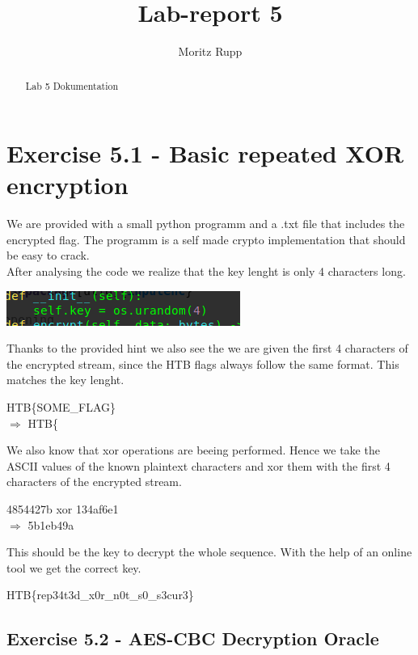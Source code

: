 \documentclass[a4paper,10pt]{article}
\title{Lab-report 5}
\author{Moritz Rupp}
\begin{document}
\maketitle
\tableofcontents
\begin{abstract}
Lab 5 Dokumentation
\end{abstract}
\newpage
\section{Exercise 5.1 - Basic repeated XOR encryption}
We are provided with a small python programm and a .txt file that includes the encrypted flag. The programm is a self made crypto implementation that should be easy to crack.\\
After analysing the code we realize that the key lenght is only 4 characters long.	
\begin{center}
 \includegraphics[scale=0.5]{keylen.png}
\end{center}
Thanks to the provided hint we also see the we are given the first 4 characters of the encrypted stream, since the HTB flags always follow the same format. This matches the key lenght.
\begin{center}
 \begin{shaded}
 HTB\{SOME\_FLAG\}\\
 $\Rightarrow$ HTB\{ 
\end{shaded}
\end{center}
We also know that xor operations are beeing performed. Hence we take the ASCII values of the known plaintext characters and xor them with the first 4 characters of the encrypted stream.
\begin{center}
4854427b xor 134af6e1\\
$\Rightarrow$ 5b1eb49a
\end{center}
This should be the key to decrypt the whole sequence. With the help of an online tool we get the correct key.
\begin{center}
 \begin{shaded}
 HTB\{rep34t3d\_x0r\_n0t\_s0\_s3cur3\}
 \end{shaded}
\end{center}
\newpage
\subsection{Exercise 5.2 - AES-CBC Decryption Oracle}
\end{document}
